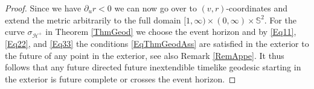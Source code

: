 \documentclass[reqno]{article}
\newcommand{\Hp}{\mathcal{H}^+}
\newcommand{\rd}{\partial}
\begin{document}
\begin{proof}
Since we have $\rd_u r <0$ we can now go over to $(v,r)$-coordinates and extend the metric arbitrarily to the full domain $[1, \infty) \times (0, \infty) \times \mathbb{S}^2$. For the curve $\sigma_{\Hp}$ in Theorem \ref{ThmGeod} we choose the event horizon and by \eqref{Eq11}, \eqref{Eq22}, and \eqref{Eq33} the conditions \eqref{EqThmGeodAss} are satisfied in the exterior to the future of any point in the exterior, see also Remark \ref{RemAppe}. It thus follows that any future directed future inextendible timelike geodesic starting in the exterior is future complete or crosses the event horizon.
\end{proof}







\end{document}
